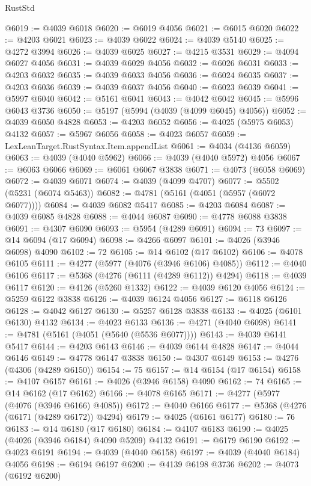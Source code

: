 \begin{lexlean}{RustStd}
\begin{coremodule}
@6019 := @4039 @6018
@6020 := @6019 @4056
@6021 := @6015 @6020
@6022 := @4203 @6021
@6023 := @4039 @6022
@6024 := @4039 @5140
@6025 := @4272 @3994
@6026 := @4039 @6025
@6027 := @4215 @3531
@6029 := @4094 @6027 @4056
@6031 := @4039 @6029 @4056
@6032 := @6026 @6031
@6033 := @4203 @6032
@6035 := @4039 @6033 @4056
@6036 := @6024 @6035
@6037 := @4203 @6036
@6039 := @4039 @6037 @4056
@6040 := @6023 @6039
@6041 := @5997 @6040
@6042 := @5161 @6041
@6043 := @4042 @6042
@6045 := @5996 @6043 @3736
@6050 := @5197 (@5994 (@4039 (@4099 @6045) @4056))
@6052 := @4039 @6050 @4828
@6053 := @4203 @6052
@6056 := @4025 (@5975 @6053) @4132
@6057 := @5967 @6056
@6058 := @4023 @6057
@6059 := LexLeanTarget.RustSyntax.Item.appendList
@6061 := @4034 (@4136 @6059)
@6063 := @4039 (@4040 @5962)
@6066 := @4039 (@4040 @5972) @4056
@6067 := @6063 @6066
@6069 := @6061 @6067 @3838
@6071 := @4073 (@6058 @6069)
@6072 := @4039 @6071
@6074 := @4039 (@4099 @4707)
@6077 := @5502 (@5231 (@6074 @5463))
@6082 := @4781 (@5161 (@4051 (@5957 (@6072 @6077))))
@6084 := @4039 @6082 @5417
@6085 := @4203 @6084
@6087 := @4039 @6085 @4828
@6088 := @4044 @6087
@6090 := @4778 @6088 @3838
@6091 := @4307 @6090
@6093 := @5954 (@4289 @6091)
@6094 := 73
@6097 := @14 @6094 (@17 @6094)
@6098 := @4266 @6097
@6101 := @4026 (@3946 @6098) @4090
@6102 := 72
@6105 := @14 @6102 (@17 @6102)
@6106 := @4078 @6105
@6111 := @4277 (@5977 (@4076 (@3946 @6106) @4085))
@6112 := @4040 @6106
@6117 := @5368 (@4276 (@6111 (@4289 @6112)) @4294)
@6118 := @4039 @6117
@6120 := @4126 (@5260 @1332)
@6122 := @4039 @6120 @4056
@6124 := @5259 @6122 @3838
@6126 := @4039 @6124 @4056
@6127 := @6118 @6126
@6128 := @4042 @6127
@6130 := @5257 @6128 @3838
@6133 := @4025 (@6101 @6130) @4132
@6134 := @4023 @6133
@6136 := @4271 (@4040 @6098)
@6141 := @4781 (@5161 (@4051 (@5640 (@5536 @6077))))
@6143 := @4039 @6141 @5417
@6144 := @4203 @6143
@6146 := @4039 @6144 @4828
@6147 := @4044 @6146
@6149 := @4778 @6147 @3838
@6150 := @4307 @6149
@6153 := @4276 (@4306 (@4289 @6150))
@6154 := 75
@6157 := @14 @6154 (@17 @6154)
@6158 := @4107 @6157
@6161 := @4026 (@3946 @6158) @4090
@6162 := 74
@6165 := @14 @6162 (@17 @6162)
@6166 := @4078 @6165
@6171 := @4277 (@5977 (@4076 (@3946 @6166) @4085))
@6172 := @4040 @6166
@6177 := @5368 (@4276 (@6171 (@4289 @6172)) @4294)
@6179 := @4025 (@6161 @6177)
@6180 := 76
@6183 := @14 @6180 (@17 @6180)
@6184 := @4107 @6183
@6190 := @4025 (@4026 (@3946 @6184) @4090 @5209) @4132
@6191 := @6179 @6190
@6192 := @4023 @6191
@6194 := @4039 (@4040 @6158)
@6197 := @4039 (@4040 @6184) @4056
@6198 := @6194 @6197
@6200 := @4139 @6198 @3736
@6202 := @4073 (@6192 @6200)

\end{coremodule}
\end{lexlean}
